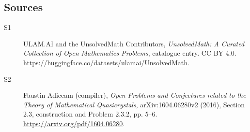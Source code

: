 \documentclass[11pt]{article}
\begin{document}
\subsection{Sources}
\begin{description}
\item[\hypertarget{source:statement:1}{S1}] ULAM.AI and the UnsolvedMath Contributors, \emph{UnsolvedMath: A Curated Collection of Open Mathematics Problems}, catalogue entry. CC BY 4.0. \url{https://huggingface.co/datasets/ulamai/UnsolvedMath}.
\item[\hypertarget{source:statement:2}{S2}] Faustin Adiceam (compiler), \emph{Open Problems and Conjectures related to the Theory of Mathematical Quasicrystals}, arXiv:1604.06280v2 (2016), Section 2.3, construction and Problem 2.3.2, pp. 5--6. \url{https://arxiv.org/pdf/1604.06280}.
\end{description}
\label{end:statement}
\end{document}
